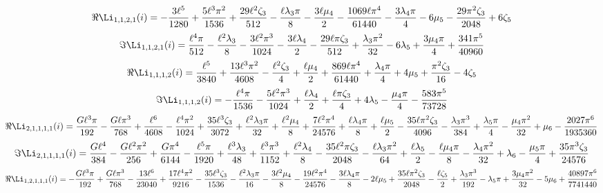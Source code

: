 \[
\Re\Li_{1,1,2,1}(i) = - \frac{3 \ell^{5}}{1280} + \frac{5 \ell^{3} \pi^{2}}{1536} + \frac{29 \ell^{2} \zeta_{3}}{512} - \frac{\ell \lambda_{3} \pi}{8} - \frac{3 \ell \mu_{4}}{2} - \frac{1069 \ell \pi^{4}}{61440} - \frac{3 \lambda_{4} \pi}{4} - 6 \mu_{5} - \frac{29 \pi^{2} \zeta_{3}}{2048} + 6 \zeta_{5}
\]
\[
\Im\Li_{1,1,2,1}(i) = \frac{\ell^{4} \pi}{512} - \frac{\ell^{2} \lambda_{3}}{8} - \frac{3 \ell^{2} \pi^{3}}{1024} - \frac{3 \ell \lambda_{4}}{2} - \frac{29 \ell \pi \zeta_{3}}{512} + \frac{\lambda_{3} \pi^{2}}{32} - 6 \lambda_{5} + \frac{3 \mu_{4} \pi}{4} + \frac{341 \pi^{5}}{40960}
\]
\[
\Re\Li_{1,1,1,2}(i) = \frac{\ell^{5}}{3840} + \frac{13 \ell^{3} \pi^{2}}{4608} - \frac{\ell^{2} \zeta_{3}}{4} + \frac{\ell \mu_{4}}{2} + \frac{869 \ell \pi^{4}}{61440} + \frac{\lambda_{4} \pi}{4} + 4 \mu_{5} + \frac{\pi^{2} \zeta_{3}}{16} - 4 \zeta_{5}
\]
\[
\Im\Li_{1,1,1,2}(i) = - \frac{\ell^{4} \pi}{1536} - \frac{5 \ell^{2} \pi^{3}}{1024} + \frac{\ell \lambda_{4}}{2} + \frac{\ell \pi \zeta_{3}}{4} + 4 \lambda_{5} - \frac{\mu_{4} \pi}{4} - \frac{583 \pi^{5}}{73728}
\]
\[
\Re\Li_{2,1,1,1,1}(i) = \frac{G \ell^{3} \pi}{192} - \frac{G \ell \pi^{3}}{768} + \frac{\ell^{6}}{4608} - \frac{\ell^{4} \pi^{2}}{1024} + \frac{35 \ell^{3} \zeta_{3}}{3072} + \frac{\ell^{2} \lambda_{3} \pi}{32} + \frac{\ell^{2} \mu_{4}}{8} + \frac{7 \ell^{2} \pi^{4}}{24576} + \frac{\ell \lambda_{4} \pi}{8} + \frac{\ell \mu_{5}}{2} - \frac{35 \ell \pi^{2} \zeta_{3}}{4096} - \frac{\lambda_{3} \pi^{3}}{384} + \frac{\lambda_{5} \pi}{4} - \frac{\mu_{4} \pi^{2}}{32} + \mu_{6} - \frac{2027 \pi^{6}}{1935360}
\]
\[
\Im\Li_{2,1,1,1,1}(i) = \frac{G \ell^{4}}{384} - \frac{G \ell^{2} \pi^{2}}{256} + \frac{G \pi^{4}}{6144} - \frac{\ell^{5} \pi}{1920} + \frac{\ell^{3} \lambda_{3}}{48} + \frac{\ell^{3} \pi^{3}}{1152} + \frac{\ell^{2} \lambda_{4}}{8} - \frac{35 \ell^{2} \pi \zeta_{3}}{2048} - \frac{\ell \lambda_{3} \pi^{2}}{64} + \frac{\ell \lambda_{5}}{2} - \frac{\ell \mu_{4} \pi}{8} - \frac{\lambda_{4} \pi^{2}}{32} + \lambda_{6} - \frac{\mu_{5} \pi}{4} + \frac{35 \pi^{3} \zeta_{3}}{24576}
\]
\[
\Re\Li_{1,2,1,1,1}(i) = - \frac{G \ell^{3} \pi}{192} + \frac{G \ell \pi^{3}}{768} - \frac{13 \ell^{6}}{23040} + \frac{17 \ell^{4} \pi^{2}}{9216} - \frac{35 \ell^{3} \zeta_{3}}{1536} - \frac{\ell^{2} \lambda_{3} \pi}{16} - \frac{3 \ell^{2} \mu_{4}}{8} - \frac{19 \ell^{2} \pi^{4}}{24576} - \frac{3 \ell \lambda_{4} \pi}{8} - 2 \ell \mu_{5} + \frac{35 \ell \pi^{2} \zeta_{3}}{2048} - \frac{\ell \zeta_{5}}{2} + \frac{\lambda_{3} \pi^{3}}{192} - \lambda_{5} \pi + \frac{3 \mu_{4} \pi^{2}}{32} - 5 \mu_{6} + \frac{40897 \pi^{6}}{7741440}
\]
